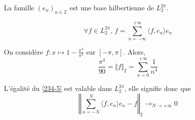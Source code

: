 
  \begin{theorem}
    La famille $(e_n)_{n \in \mathbb{Z}}$ est une base hilbertienne de $L_2^{2 \pi}$.
  \end{theorem}

  \begin{corollary}
    \label{234-5}
    \[ \forall f \in L_2^{2 \pi}, \, f = \sum_{n = -\infty}^{+\infty} \langle f, e_n \rangle e_n \]
  \end{corollary}


  \begin{example}
    On considère $f : x \mapsto 1 - \frac{x^2}{\pi^2}$ sur $[-\pi, \pi]$. Alors,
    \[ \frac{\pi^4}{90} = \Vert f \Vert_2 = \sum_{n=0}^{+\infty} \frac{1}{n^4} \]
  \end{example}


  \begin{remark}
    L'égalité du \cref{234-5} est valable dans $L_2^{2\pi}$, elle signifie donc que
    \[ \left\Vert \sum_{n = -N}^{N} \langle f, e_n \rangle e_n - f \right\Vert_2 \longrightarrow_{N \rightarrow +\infty} 0 \]
  \end{remark}


